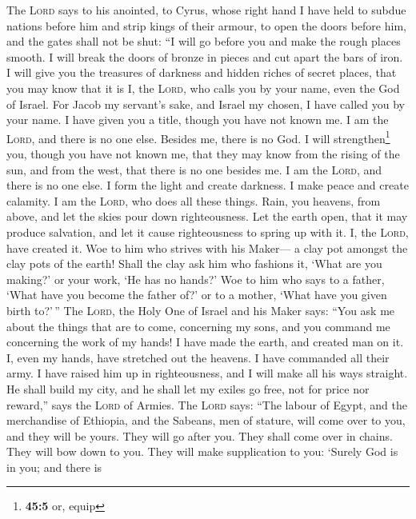  The \textsc{Lord} says to his anointed, to Cyrus, whose
right hand I have held to subdue nations before him and strip kings of
their armour, to open the doors before him, and the gates shall not be
shut:  ``I will go before you and make the rough places
smooth. I will break the doors of bronze in pieces and cut apart the
bars of iron.  I will give you the treasures of darkness
and hidden riches of secret places, that you may know that it is I, the
\textsc{Lord}, who calls you by your name, even the God of Israel.
 For Jacob my servant's sake, and Israel my chosen, I have
called you by your name. I have given you a title, though you have not
known me.  I am the \textsc{Lord}, and there is no one
else. Besides me, there is no God. I will strengthen\footnote{\textbf{45:5}
  or, equip} you, though you have not known me,  that they
may know from the rising of the sun, and from the west, that there is no
one besides me. I am the \textsc{Lord}, and there is no one else.
 I form the light and create darkness. I make peace and
create calamity. I am the \textsc{Lord}, who does all these things.
 Rain, you heavens, from above, and let the skies pour
down righteousness. Let the earth open, that it may produce salvation,
and let it cause righteousness to spring up with it. I, the
\textsc{Lord}, have created it.  Woe to him who strives
with his Maker--- a clay pot amongst the clay pots of the earth! Shall
the clay ask him who fashions it, `What are you making?' or your work,
`He has no hands?'  Woe to him who says to a father,
`What have you become the father of?' or to a mother, `What have you
given birth to?'\,''  The \textsc{Lord}, the Holy One of
Israel and his Maker says: ``You ask me about the things that are to
come, concerning my sons, and you command me concerning the work of my
hands!  I have made the earth, and created man on it. I,
even my hands, have stretched out the heavens. I have commanded all
their army.  I have raised him up in righteousness, and I
will make all his ways straight. He shall build my city, and he shall
let my exiles go free, not for price nor reward,'' says the
\textsc{Lord} of Armies.  The \textsc{Lord} says: ``The
labour of Egypt, and the merchandise of Ethiopia, and the Sabeans, men
of stature, will come over to you, and they will be yours. They will go
after you. They shall come over in chains. They will bow down to you.
They will make supplication to you: `Surely God is in you; and there is
